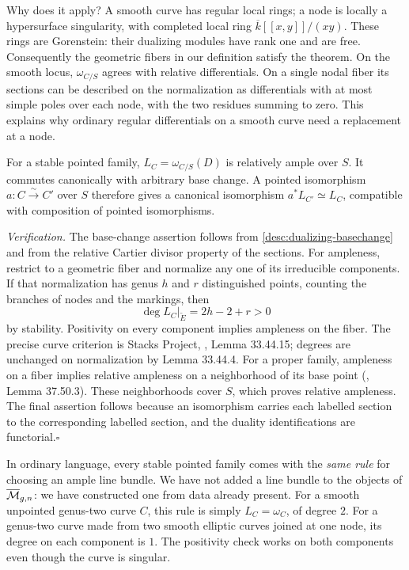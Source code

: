 Why does it apply? A smooth curve has regular local rings; a node is
locally a hypersurface singularity, with completed local ring
$\overline{k}[[x,y]]/(xy)$. These rings are Gorenstein: their dualizing
modules have rank one and are free. Consequently the geometric fibers
in our definition satisfy the theorem. On the smooth locus,
$\omega_{C/S}$ agrees with relative differentials. On a single nodal
fiber its sections can be described on the normalization as
differentials with at most simple poles over each node, with the two
residues summing to zero. This explains why ordinary regular
differentials on a smooth curve need a replacement at a node.

\begin{Lem}
\label{desc:ample-canonical}
For a stable pointed family, $L_C=\omega_{C/S}(D)$ is relatively ample
over $S$. It commutes canonically with arbitrary base change. A pointed
isomorphism $a:C\xrightarrow{\sim}C'$ over $S$ therefore gives a
canonical isomorphism $a^*L_{C'}\simeq L_C$, compatible with
composition of pointed isomorphisms.
\end{Lem}

\noindent\emph{Verification.}
The base-change assertion follows from
\eqref{desc:dualizing-basechange} and from the relative Cartier divisor
property of the sections. For ampleness, restrict to a geometric fiber
and normalize any one of its irreducible components. If that
normalization has genus $h$ and $r$ distinguished points, counting the
branches of nodes and the markings, then
\begin{equation}\label{eq:component-degree}
 \deg L_C|_{\widetilde E}=2h-2+r>0
\end{equation}
by stability. Positivity on every component implies
ampleness on the fiber. The precise curve criterion is Stacks Project,
, Lemma 33.44.15; degrees are unchanged on normalization
by Lemma 33.44.4. For a proper family, ampleness on a fiber implies
relative ampleness on a neighborhood of its base point
(, Lemma 37.50.3). These neighborhoods cover $S$, which
proves relative ampleness. The final assertion follows because an
isomorphism carries each labelled section to the corresponding labelled
section, and the duality identifications are functorial.\hfill$\square$

In ordinary language, every stable pointed family comes with the
\emph{same rule} for choosing an ample line bundle. We have not added a
line bundle to the objects of $\overline{\mathcal M}_{g,n}$: we have constructed one from data
already present. For a smooth unpointed genus-two curve $C$, this rule
is simply $L_C=\omega_C$, of degree $2$. For a genus-two curve made from
two smooth elliptic curves joined at one node, its degree on each
component is $1$. The positivity check works on both components even
though the curve is singular.

